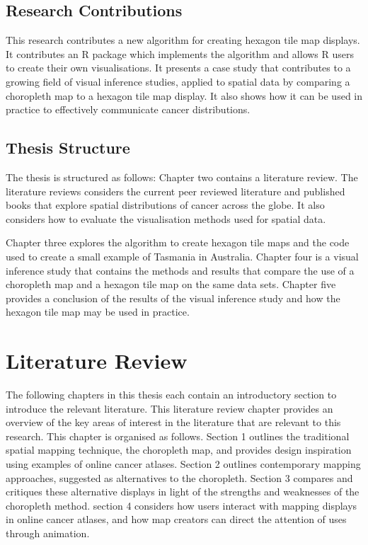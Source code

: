 \documentclass{monashthesis}
\begin{document}
\hypertarget{research-contributions}{%
\section{Research Contributions}\label{research-contributions}}

This research contributes a new algorithm for creating hexagon tile map displays. It contributes an R \autocite{R} package which implements the algorithm and allows R users to create their own visualisations.
It presents a case study that contributes to a growing field of visual inference studies, applied to spatial data by comparing a choropleth map to a hexagon tile map display.
It also shows how it can be used in practice to effectively communicate cancer distributions.

\hypertarget{thesis-structure}{%
\section{Thesis Structure}\label{thesis-structure}}

The thesis is structured as follows: Chapter two contains a literature review.
The literature reviews considers the current peer reviewed literature and published books that explore spatial distributions of cancer across the globe.
It also considers how to evaluate the visualisation methods used for spatial data.

Chapter three explores the algorithm to create hexagon tile maps and the code used to create a small example of Tasmania in Australia.
Chapter four is a visual inference study that contains the methods and results that compare the use of a choropleth map and a hexagon tile map on the same data sets.
Chapter five provides a conclusion of the results of the visual inference study and how the hexagon tile map may be used in practice.

\hypertarget{ch:literature}{%
\chapter{Literature Review}\label{ch:literature}}

The following chapters in this thesis each contain an introductory section to introduce the relevant literature. This literature review chapter provides an overview of the key areas of interest in the literature that are relevant to this research. This chapter is organised as follows. Section 1 outlines the traditional spatial mapping technique, the choropleth map, and provides design inspiration using examples of online cancer atlases. Section 2 outlines contemporary mapping approaches, suggested as alternatives to the choropleth. Section 3 compares and critiques these alternative displays in light of the strengths and weaknesses of the choropleth method. section 4 considers how users interact with mapping displays in online cancer atlases, and how map creators can direct the attention of uses through animation.
\end{document}
